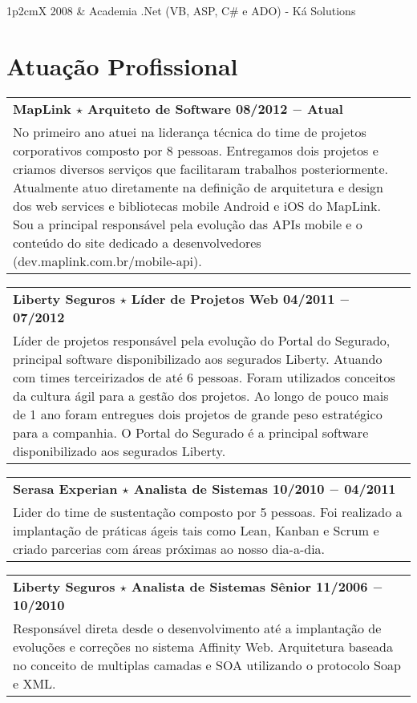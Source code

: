 \documentclass[a4paper, oneside, final]{scrartcl}
\newcommand{\vspc}{\vspace{0.15cm}} %
\begin{document}
\begin{center}
\begin{tabularx}{1\linewidth}{p{2cm}X}
2008       & Academia .Net (VB, ASP, C\# e ADO) - Ká Solutions 
\end{tabularx}


\section{Atuação Profissional}
\begin{tabularx}{1\linewidth}{X}
{\bf MapLink $\star$ Arquiteto de Software \hfill 08/2012 $-$ Atual} \\
No primeiro ano atuei na liderança técnica do time de projetos corporativos composto por 8 pessoas. Entregamos dois projetos e criamos diversos serviços que facilitaram trabalhos posteriormente. Atualmente atuo diretamente na definição de arquitetura e design dos web services e bibliotecas mobile Android e iOS do MapLink. Sou a principal responsável pela evolução das APIs mobile e o conteúdo do site dedicado a desenvolvedores (dev.maplink.com.br/mobile-api). \vspc\\
\end{tabularx}

\begin{tabularx}{1\linewidth}{X}
{\bf Liberty Seguros $\star$ Líder de Projetos Web \hfill 04/2011 $-$ 07/2012} \\
Líder de projetos responsável pela evolução do Portal do Segurado, principal software disponibilizado aos segurados Liberty. Atuando com times terceirizados de até 6 pessoas. Foram utilizados conceitos da cultura ágil para a gestão dos projetos. Ao longo de pouco mais de 1 ano foram entregues dois projetos de grande peso estratégico para a companhia. O Portal do Segurado é a principal software disponibilizado aos segurados Liberty.\vspc\\
\end{tabularx}

\begin{tabularx}{1\linewidth}{X}
{\bf Serasa Experian $\star$  Analista de Sistemas \hfill 10/2010 $-$ 04/2011} \\
Lider do time de sustentação composto por 5 pessoas. Foi realizado a implantação de práticas ágeis tais como Lean, Kanban e Scrum e criado parcerias com áreas próximas ao nosso dia-a-dia.\vspc\\
\end{tabularx}

\begin{tabularx}{1\linewidth}{X}
{\bf Liberty Seguros $\star$ Analista de Sistemas Sênior \hfill 11/2006 $-$ 10/2010} \\
Responsável direta desde o desenvolvimento até a implantação de evoluções e correções no sistema Affinity Web. Arquitetura baseada no conceito de multiplas camadas e SOA utilizando o protocolo Soap e XML.\vspc\\
\end{tabularx}


\end{center}
\end{document}

